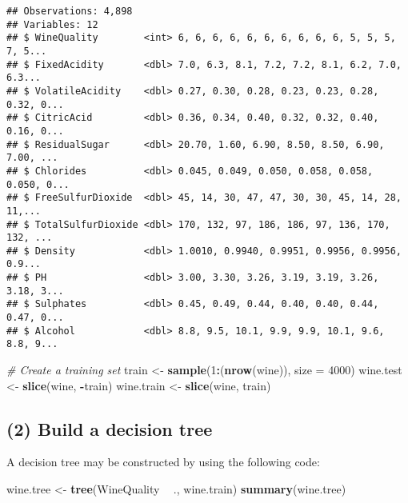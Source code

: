 \documentclass[12pt]{article}
\newenvironment{Shaded}{\begin{snugshade}}{\end{snugshade}}
\newcommand{\CommentTok}[1]{\textcolor[rgb]{0.56,0.35,0.01}{\textit{#1}}}
\newcommand{\DataTypeTok}[1]{\textcolor[rgb]{0.13,0.29,0.53}{#1}}
\newcommand{\DecValTok}[1]{\textcolor[rgb]{0.00,0.00,0.81}{#1}}
\newcommand{\KeywordTok}[1]{\textcolor[rgb]{0.13,0.29,0.53}{\textbf{#1}}}
\newcommand{\NormalTok}[1]{#1}
\newcommand{\OperatorTok}[1]{\textcolor[rgb]{0.81,0.36,0.00}{\textbf{#1}}}
\newcommand{\StringTok}[1]{\textcolor[rgb]{0.31,0.60,0.02}{#1}}
\begin{document}
\begin{verbatim}
## Observations: 4,898
## Variables: 12
## $ WineQuality        <int> 6, 6, 6, 6, 6, 6, 6, 6, 6, 6, 5, 5, 5, 7, 5...
## $ FixedAcidity       <dbl> 7.0, 6.3, 8.1, 7.2, 7.2, 8.1, 6.2, 7.0, 6.3...
## $ VolatileAcidity    <dbl> 0.27, 0.30, 0.28, 0.23, 0.23, 0.28, 0.32, 0...
## $ CitricAcid         <dbl> 0.36, 0.34, 0.40, 0.32, 0.32, 0.40, 0.16, 0...
## $ ResidualSugar      <dbl> 20.70, 1.60, 6.90, 8.50, 8.50, 6.90, 7.00, ...
## $ Chlorides          <dbl> 0.045, 0.049, 0.050, 0.058, 0.058, 0.050, 0...
## $ FreeSulfurDioxide  <dbl> 45, 14, 30, 47, 47, 30, 30, 45, 14, 28, 11,...
## $ TotalSulfurDioxide <dbl> 170, 132, 97, 186, 186, 97, 136, 170, 132, ...
## $ Density            <dbl> 1.0010, 0.9940, 0.9951, 0.9956, 0.9956, 0.9...
## $ PH                 <dbl> 3.00, 3.30, 3.26, 3.19, 3.19, 3.26, 3.18, 3...
## $ Sulphates          <dbl> 0.45, 0.49, 0.44, 0.40, 0.40, 0.44, 0.47, 0...
## $ Alcohol            <dbl> 8.8, 9.5, 10.1, 9.9, 9.9, 10.1, 9.6, 8.8, 9...
\end{verbatim}

\begin{Shaded}
\begin{Highlighting}[]
\CommentTok{# Create a training set}
\NormalTok{train <-}\StringTok{ }\KeywordTok{sample}\NormalTok{(}\DecValTok{1}\OperatorTok{:}\NormalTok{(}\KeywordTok{nrow}\NormalTok{(wine)), }\DataTypeTok{size =} \DecValTok{4000}\NormalTok{)}
\NormalTok{wine.test  <-}\StringTok{ }\KeywordTok{slice}\NormalTok{(wine, }\OperatorTok{-}\NormalTok{train)}
\NormalTok{wine.train <-}\StringTok{ }\KeywordTok{slice}\NormalTok{(wine, train)}
\end{Highlighting}
\end{Shaded}

\hypertarget{build-a-decision-tree}{%
\subsection{(2) Build a decision tree}\label{build-a-decision-tree}}

A decision tree may be constructed by using the following code:

\begin{Shaded}
\begin{Highlighting}[]
\NormalTok{wine.tree <-}\StringTok{ }\KeywordTok{tree}\NormalTok{(WineQuality }\OperatorTok{~}\StringTok{ }\NormalTok{., wine.train)}
\KeywordTok{summary}\NormalTok{(wine.tree)}
\end{Highlighting}
\end{Shaded}
\end{document}
